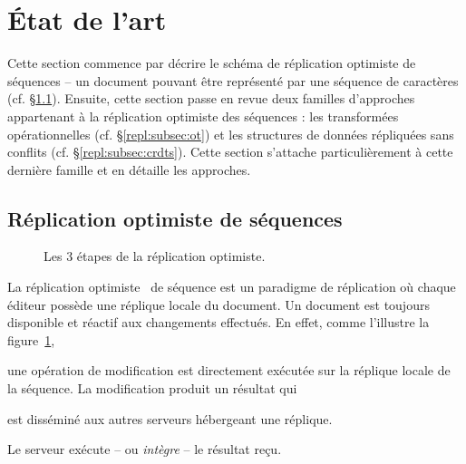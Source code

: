 

\section{État de l'art}
\label{repl:sec:stateoftheart}

Cette section commence par décrire le schéma de réplication optimiste de
séquences -- un document pouvant être représenté par une séquence de caractères
(cf. §\ref{repl:subsec:optimistic}).  Ensuite, cette section passe en revue deux
familles d'approches appartenant à la réplication optimiste des séquences : les
transformées opérationnelles (cf. §\ref{repl:subsec:ot}) et les structures de
données répliquées sans conflits (cf. §\ref{repl:subsec:crdts}). Cette section
s'attache particulièrement à cette dernière famille et en détaille les
approches.

\subsection{Réplication optimiste de séquences}
\label{repl:subsec:optimistic}

\begin{figure}
  \begin{center}
    
    \caption[Étapes de la réplication
    optimiste]{\label{repl:fig:optimisticsteps} Les 3 étapes de la réplication
      optimiste.}    
  \end{center}
\end{figure}

La réplication optimiste~\cite{demers1987epidemic, johnson1975maintenance,
  ladin1992providing, saito2005optimistic} de séquence est un paradigme de
réplication où chaque éditeur possède une réplique locale du document.  Un
document est toujours disponible et réactif aux changements effectués. En effet,
comme l'illustre la figure~\ref{repl:fig:optimisticsteps},
\begin{inparaenum}[(a)]
\item une opération de modification est directement exécutée sur la réplique
  locale de la séquence.  La modification produit un résultat qui
\item est disséminé aux autres serveurs hébergeant une réplique.
\item Le serveur exécute -- ou \emph{intègre} -- le résultat reçu.
\end{inparaenum}

